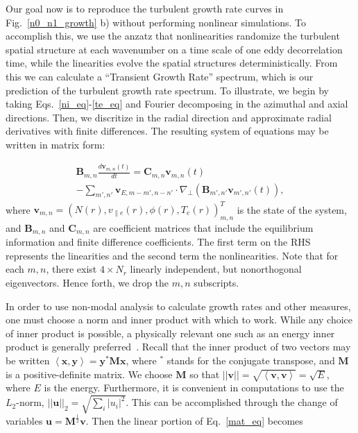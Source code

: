 \documentclass[letter,scriptaddress,twocolumn, prl,showkeys]{revtex4}
\def\beqar{\begin{eqnarray}}
\def\eeqar{\end{eqnarray}}
\newcommand{\diff}[2]{\frac{d#1}{d#2}}
\def\grad{\nabla}
\newcommand{\gradperp}{\grad_\perp}
\newcommand{\vpe}{v_{\parallel e}}
\begin{document}
Our goal now is to reproduce the turbulent growth rate curves in Fig.~\ref{n0_n1_growth} b) without performing nonlinear simulations. 
To accomplish this, we use the anzatz that nonlinearities randomize the turbulent spatial structure at each wavenumber on a time scale of 
one eddy decorrelation time, while the linearities evolve the spatial structures deterministically. From this we can calculate a ``Transient Growth Rate'' spectrum,
which is our prediction of the turbulent growth rate spectrum. To illustrate,
we begin by taking Eqs.~\ref{ni_eq}-\ref{te_eq} and Fourier decomposing in the azimuthal and axial directions.  Then, we discritize in the radial direction and
approximate radial derivatives with finite differences.  The resulting system of equations may be written in matrix form:

\beqar
\label{mat_eq}
\mathbf{B}_{m,n} \diff{\mathbf{v}_{m,n}(t)}{t} = \mathbf{C}_{m,n} \mathbf{v}_{m,n}(t) \nonumber \\
- \sum_{m',n'}  \mathbf{v}_{E,m-m',n-n'} \cdot \gradperp \left( \mathbf{B}_{m',n'} \mathbf{v}_{m',n'}(t) \right),
\eeqar
where $\mathbf{v}_{m,n} = \left( N(r), \vpe(r), \phi(r), T_e(r) \right)_{m,n}^{T}$ is the state of the system,
and $\mathbf{B}_{m,n}$ and $\mathbf{C}_{m,n}$ are coefficient matrices that include the equilibrium information and finite difference coefficients. The first term on the RHS represents the linearities
and the second term the nonlinearities. Note that for each $m,n$, there exist $4 \times N_r$ linearly independent, but nonorthogonal eigenvectors. Hence forth, we drop the $m,n$ subscripts.

In order to use non-modal analysis to calculate growth rates and other measures, one must choose a norm and inner product with which to work. While any choice of
inner product is possible, a physically relevant one such as an energy inner product is generally preferred~\cite{camargo1998,schmid2007,camporeale2010}. 
Recall that the inner product of two vectors may be written $\left< \mathbf{x},\mathbf{y} \right> = \mathbf{y}^{*} \mathbf{M} \mathbf{x}$,
where $^*$ stands for the conjugate transpose, and $\mathbf{M}$ is a positive-definite matrix. We choose $\mathbf{M}$ so that 
$||\mathbf{v}|| = \sqrt{\left< \mathbf{v},\mathbf{v} \right>} = \sqrt{E}$, where $E$ is the energy. Furthermore, it is convenient in
computations to use the $L_2$-norm, $||\mathbf{u}||_2 = \sqrt{\sum_i |u_i|^2}$. This can be accomplished through the change of variables $\mathbf{u} = \mathbf{M}^{\frac{1}{2}} \mathbf{v}$.
Then the linear portion of Eq.~\ref{mat_eq} becomes
\end{document}
